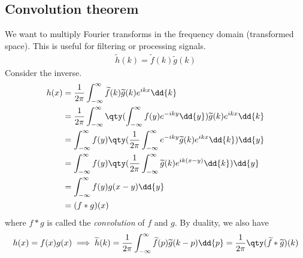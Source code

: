 \subsection{Convolution theorem}
We want to multiply Fourier transforms in the frequency domain (transformed space).
This is useful for filtering or processing signals.
\begin{align*}
	\widetilde h(k) = \widetilde f(k) \widetilde g(k)
\end{align*}
Consider the inverse.
\begin{align*}
	h(x) & = \frac{1}{2\pi} \int_{-\infty}^\infty \widetilde f(k) \widetilde g(k) e^{ikx} \dd{k}                                    \\
	     & = \frac{1}{2\pi} \int_{-\infty}^\infty \qty(\int_{-\infty}^\infty f(y) e^{-iky} \dd{y}) \widetilde g(k) e^{ikx} \dd{k}   \\
	     & = \int_{-\infty}^\infty f(y) \qty( \frac{1}{2\pi} \int_{-\infty}^\infty e^{-iky} \widetilde g(k) e^{ikx} \dd{k} ) \dd{y} \\
	     & = \int_{-\infty}^\infty f(y) \qty( \frac{1}{2\pi} \int_{-\infty}^\infty \widetilde g(k) e^{ik(x-y)} \dd{k} ) \dd{y}      \\
	     & = \int_{-\infty}^\infty f(y) g(x-y) \dd{y}                                                                               \\
	     & = (f \ast g)(x)
\end{align*}
where $f \ast g$ is called the \textit{convolution} of $f$ and $g$.
By duality, we also have
\begin{align*}
	h(x) = f(x) g(x) \implies \widetilde h(k) = \frac{1}{2\pi} \int_{-\infty}^\infty \widetilde f(p) \widetilde g(k-p) \dd{p} = \frac{1}{2\pi}\qty(\widetilde f \ast \widetilde g)(k)
\end{align*}

